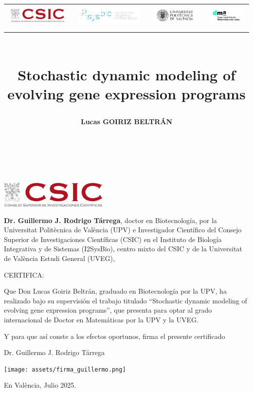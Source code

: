 \documentclass[11pt]{book}
\title{
  \begin{center}
    \vspace{-3cm}
    \begin{adjustbox}{center}
    \begin{tabular}{cccc}
        \includegraphics[height=0.8cm]{assets/csic_logo.png} &
        \includegraphics[height=1cm]{assets/i2sysbio_logo.png} &
        \includegraphics[height=0.9cm]{assets/upv_logo.png} &
        \includegraphics[height=1cm]{assets/dma_logo.jpg}
    \end{tabular}
    \end{adjustbox}
  
    \vspace{1cm}
  \end{center}
  \vspace{2cm}
  \makebox[\textwidth][c]{\rule{.9\textwidth}{2pt}}\\[1.2ex]
  \textbf{Stochastic dynamic modeling of evolving gene expression programs}\\[0.5ex]
  \makebox[\textwidth][c]{\rule{.9\textwidth}{2pt}}
}
\author{\textbf{Lucas GOIRIZ BELTRÁN}}
\date{
    \vfill
    \textbf{
        Thesis Advisors:\\
        Dr. Guillermo RODRIGO TÁRREGA\\
        Prof. Dr. J. Alberto CONEJERO CASARES
    }
    \vspace{1cm}
    \begin{center}
    Valencia, June 2025
    \end{center}
}
\theoremstyle{definition}
\begin{document}
\maketitle
{}
\pagebreak ~

\chapter*{}
\vspace{-4cm}

\begin{flushright}
\includegraphics[width=0.4\textwidth]{assets/csic_logo.png}
\end{flushright}

\vspace{0.5cm}

\noindent\textbf{Dr. Guillermo J. Rodrigo Tárrega}, doctor en Biotecnología, por la Universitat Politècnica de València (UPV)
e Investigador Científico del Consejo Superior de Investigaciones Científicas (CSIC) en el Instituto de Biología Integrativa y de Sistemas (I2SysBio),
centro mixto del CSIC y de la Universitat de València Estudi General (UVEG),

\vspace{1.5cm}

CERTIFICA:

\vspace{1.5cm}

\noindent Que Don Lucas Goiriz Beltrán, graduado en Biotecnología por la UPV, ha realizado bajo su supervisión el trabajo titulado
``Stochastic dynamic modeling of evolving gene expression programs'', que presenta para optar al grado internacional de Doctor en Matemáticas por la UPV y la UVEG.

\vspace{1cm}

Y para que así conste a los efectos oportunos, firma el presente certificado

\vspace{1cm}


\begin{center}
Dr. Guillermo J. Rodrigo Tárrega

\texttt{[image: assets/firma\_guillermo.png]}

En València, Julio 2025.

\end{center}
\end{document}
